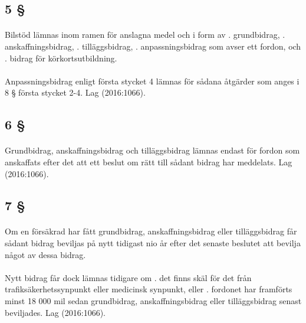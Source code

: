 \documentclass[a4paper,notitlepage,openany,10pt]{book}
\begin{document}
\subsection*{5 §}
\paragraph*{}
Bilstöd lämnas inom ramen för anslagna medel och i form av
. grundbidrag,
. anskaffningsbidrag,
. tilläggsbidrag,
. anpassningsbidrag som avser ett fordon, och
. bidrag för körkortsutbildning.
\paragraph*{}
Anpassningsbidrag enligt första stycket 4 lämnas för sådana åtgärder som anges i 8 § första stycket 2-4.
Lag (2016:1066).
\subsection*{6 §}
\paragraph*{}
Grundbidrag, anskaffningsbidrag och tilläggsbidrag lämnas endast för fordon som anskaffats efter det att ett beslut om rätt till sådant bidrag har meddelats.
Lag (2016:1066).
\subsection*{7 §}
\paragraph*{}
Om en försäkrad har fått grundbidrag, anskaffningsbidrag eller tilläggsbidrag får sådant bidrag beviljas på nytt tidigast nio år efter det senaste beslutet att bevilja något av dessa bidrag.
\paragraph*{}
Nytt bidrag får dock lämnas tidigare om
. det finns skäl för det från trafiksäkerhetssynpunkt eller medicinsk synpunkt, eller
. fordonet har framförts minst 18 000 mil sedan grundbidrag, anskaffningsbidrag eller tilläggsbidrag senast beviljades.
Lag (2016:1066).
\end{document}
